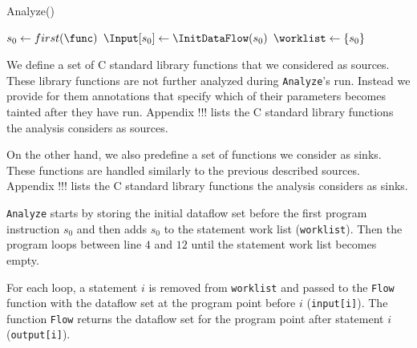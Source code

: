 \begin{procedure}
\caption{Analyze()}\label{fig:algoAnalyze}
\SetAlgoLined
\LinesNumbered
\DontPrintSemicolon
{}


$ s_0 \leftarrow first(\func)$\;
$\Input[s_0] \leftarrow \InitDataFlow(s_0)$\;
$\worklist \leftarrow \set{s_0}$\;
\While{ $\worklist\ !=\ \emptyset$ }{
	$\varI \leftarrow \Next(\worklist)$\;
	$\Output[i] = \Flow(\Analyze, \varI, \Input[\varI])$\;
	\ForEach{ $\varJ \in \Succs(\varI)$ }{
		\If{ $\Output[\varI] \not\sqsubseteq \Input[\varJ]$}{
			$\Input[\varJ] = \Input[\varJ] \sqcup \Output[\varI]$\;
			$\worklist = \worklist \cup\ \set{\varJ}$\;
		}	
	}
}
\end{procedure}
\DecMargin{1em}

We define a set of C standard library functions that
we considered as sources. These library functions are not
further analyzed during \texttt{Analyze}'s run.
Instead we provide for them annotations that specify
which of their parameters becomes tainted after they
have run. Appendix !!! lists the C standard library
functions the analysis considers as sources.

On the other hand, we also predefine a set of functions
we consider as sinks. These functions are handled similarly
to the previous described sources. Appendix !!! lists
the C standard library functions the analysis considers
as sinks.

\texttt{Analyze} starts by storing the initial dataflow
set before the first program instruction $s_0$ and then
adds $s_0$ to the statement work list (\texttt{worklist}).
Then the program loops between line $4$ and $12$ until
the statement work list becomes empty.



For each loop, a statement $i$ is removed from
\texttt{worklist} and passed to the \texttt{Flow} function
with the dataflow set at the program point before $i$ (\texttt{input[i]}).
The function \texttt{Flow} returns the dataflow set for
the program point after statement $i$ (\texttt{output[i]}).

